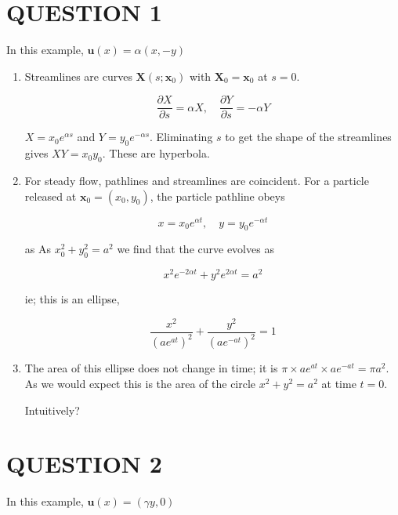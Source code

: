 \documentclass[a4paper]{article}
\begin{document}
	
\maketitle

\section{QUESTION 1}

In this example, $ \mathbf{u}(x) = \alpha(x,-y) $

\begin{enumerate}
	\item Streamlines are curves $ \mathbf{X}(s; \mathbf{x}_{0}) $ with $ \mathbf{X}_{0} = \mathbf{x}_{0} $ at $ s = 0 $. 
	
	\[ \frac{\partial X }{\partial s} = \alpha X, \quad \frac{\partial Y }{\partial s} = - \alpha Y \]
	
	$ X = x_{0} e^{\alpha s} $ and $ Y = y_{0}e^{- \alpha s} $. Eliminating $ s $ to get the shape of the streamlines gives $ XY = x_{0}y_{0} $. These are hyperbola.
	
	\item For steady flow, pathlines and streamlines are coincident. For a particle released at $ \mathbf{x}_{0} = (x_{0},y_{0}) $, the particle pathline obeys
	
	\[ x = x_{0} e^{\alpha t}, \quad y = y_{0}e^{- \alpha t} \]
	
	as  As $ x_{0}^{2} + y_{0}^{2} = a^{2} $ we find that the curve evolves as
	
	\[ x^{2}e^{-2\alpha t} + y^{2}e^{2 \alpha t} = a^{2} \]
	
	ie; this is an ellipse,
	
	
	\[ \frac{x^{2}}{(ae^{at})^{2}} + \frac{y^{2}}{(ae^{-at})^{2}} = 1 \]
	
	\item 
	
	The area of this ellipse does not change in time; it is $ \pi \times ae^{at} \times ae^{-at} = \pi a^{2} $. As we would expect this is the area of the circle $ x^{2} + y^{2} = a^{2} $ at time $ t = 0 $. 
	
	Intuitively?
	
	
\end{enumerate}


\section{QUESTION 2}

In this example, $ \mathbf{u}(x) = (\gamma y, 0) $
\end{document}

